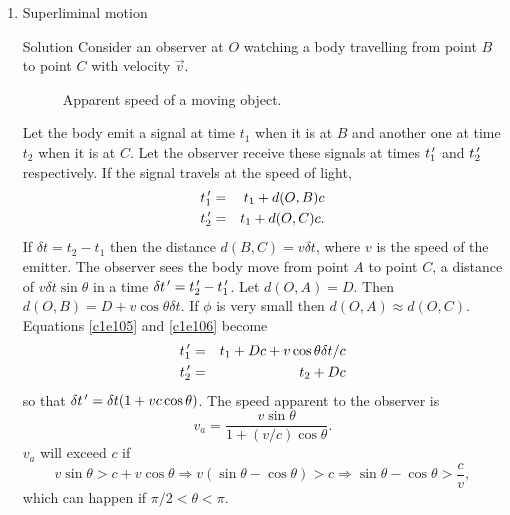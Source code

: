 \begin{enumerate}
\item Superliminal motion \cite{pg}
\item[Solution] Consider an observer at $O$ watching a body travelling from
point $B$ to point $C$ with velocity $\vec{v}$. 
\begin{figure}
\centering
{}
\caption{Apparent speed of a moving object.}
\end{figure}

Let the body emit a signal at time $t_1$ when it is at $B$ and another one at
time $t_2$ when it is at $C$. Let the observer receive these signals at times
$t_1^{\,\prime}$ and $t_2^{\,\prime}$ respectively. If the signal travels at the speed of
light,
\begin{eqnarray}
t_1^{\,\prime} &=& t_1 + d(O, B)c \label{c1e105} \\
t_2^{\,\prime} &=& t_1 + d(O, C)c. \label{c1e106}
\end{eqnarray}
If $\delta t = t_2 - t_1$ then the distance $d(B, C) = v\delta t$, where $v$
is the speed of the emitter. The observer sees the body move from point $A$
to point $C$, a distance of $v\delta t\sin\theta$ in a time $\delta t^{\,\prime} =
t_2^{\,\prime} - t_1^{\,\prime}$. Let $d(O, A)=D$. Then $d(O, B) = D + v\cos\theta\delta t$.
If $\phi$ is very small then $d(O, A) \approx d(O, C)$. Equations \eqref{c1e105}
and \eqref{c1e106} become
\begin{eqnarray}
t_1^{\,\prime} &=& t_1 + Dc + v\cos\theta\delta t/c \label{c1e107} \\
t_2^{\,\prime} &=& t_2 + Dc \label{c1e108}
\end{eqnarray}
so that $\delta t^{\,\prime} = \delta t(1  + vc\cos\theta)$. The speed apparent to
the observer is 
\begin{equation}\label{c1e109}
v_a = \frac{v\sin\theta}{1 + (v/c)\cos\theta}.
\end{equation}
$v_a$ will exceed $c$ if
\[
v\sin\theta > c + v\cos\theta \Rightarrow v(\sin\theta - \cos\theta) > c
\Rightarrow \sin\theta - \cos\theta > \frac{c}{v},
\]
which can happen if $\pi/2 < \theta < \pi$.
\end{enumerate}
